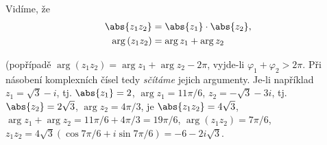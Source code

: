        
    
      \begin{mdframed}[style=highlight]
        Vidíme, že
        \begin{subequations}\label{mai:eq74}
          \begin{align}
              \abs{z_1z_2}   &= \abs{z_1}\cdot\abs{z_2}, \\
              \arg{(z_1z_2)} &= \arg{z_1} + \arg{z_2} 
          \end{align}
        \end{subequations}  
      \end{mdframed}
      (popřípadě \(\arg{(z_1z_2)} = \arg{z_1} + \arg{z_2} - 2\pi\), vyjde-li \(\varphi_1+\varphi_2 > 
      2\pi\). Při násobení komplexních čísel tedy \emph{sčítáme} jejich argumenty. Je-li například 
      \(z_1=\sqrt{3} - i\), tj. \(\abs{z_1} = 2\), \(\arg{z_1} = 11\pi/6\), \(z_2 = -\sqrt{3} - 3i\), 
      tj. \(\abs{z_2} = 2\sqrt{3}\), \(\arg{z_2} = 4\pi/3\), je \(\abs{z_1z_2} = 4\sqrt{3}\), 
      \(\arg{z_1} + \arg{z_2} = 11\pi/6 + 4\pi/3 = 19\pi/6\), \(\arg{(z_1z_2)} = 7\pi/ 6\), 
      \(z_1z_2 = 4\sqrt{3}(\cos7\pi/6 + i\sin7\pi/6)= -6 -2i\sqrt{3}\). 
      
